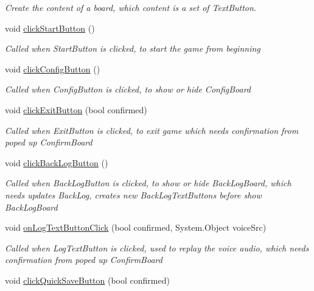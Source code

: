 \begin{DoxyCompactItemize}
\begin{DoxyCompactList}\small\item\em Create the content of a board, which content is a set of Text\+Button. \end{DoxyCompactList}\item 
void \hyperlink{class_world_control_a722399aefebc9b0a78e726e6de021376}{click\+Start\+Button} ()
\begin{DoxyCompactList}\small\item\em Called when Start\+Button is clicked, to start the game from beginning \end{DoxyCompactList}\item 
void \hyperlink{class_world_control_a17571acf0b8b2f71750c1903eccc0e72}{click\+Config\+Button} ()
\begin{DoxyCompactList}\small\item\em Called when Config\+Button is clicked, to show or hide Config\+Board \end{DoxyCompactList}\item 
void \hyperlink{class_world_control_aa1634636a07f080ce6d52a1c86320f54}{click\+Exit\+Button} (bool confirmed)
\begin{DoxyCompactList}\small\item\em Called when Exit\+Button is clicked, to exit game which needs confirmation from poped up Confirm\+Board \end{DoxyCompactList}\item 
void \hyperlink{class_world_control_a2636ddab0b0d16ccb407b7ae5be18d02}{click\+Back\+Log\+Button} ()
\begin{DoxyCompactList}\small\item\em Called when Back\+Log\+Button is clicked, to show or hide Back\+Log\+Board, which needs updates Back\+Log, creates new Back\+Log\+Text\+Buttons before show Back\+Log\+Board \end{DoxyCompactList}\item 
void \hyperlink{class_world_control_aa43a5ac856deb48676eb01a260e9c6aa}{on\+Log\+Text\+Button\+Click} (bool confirmed, System.\+Object voice\+Src)
\begin{DoxyCompactList}\small\item\em Called when Log\+Text\+Button is clicked, used to replay the voice audio, which needs confirmation from poped up Confirm\+Board \end{DoxyCompactList}\item 
void \hyperlink{class_world_control_a5d2f11fb2e6ec8d0691c4843666ea5e0}{click\+Quick\+Save\+Button} (bool confirmed)

\end{DoxyCompactItemize}
